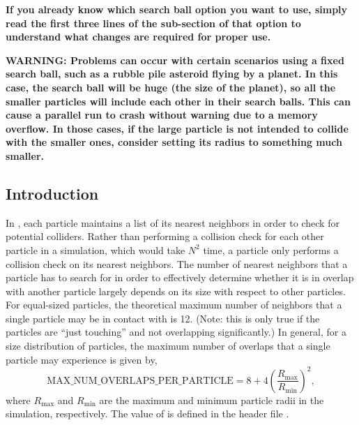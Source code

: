 \textbf{If you already know which search ball option you want to use,
  simply read the first three lines of the sub-section of that option
  to understand what changes are required for proper use.}

\textbf{WARNING: Problems can occur with certain scenarios using a
  fixed search ball, such as a rubble pile asteroid flying by a
  planet.  In this case, the search ball will be huge (the size of the
  planet), so all the smaller particles will include each other in
  their search balls.  This can cause a parallel run to crash without
  warning due to a memory overflow.  In those cases, if the large
  particle is not intended to collide with the smaller ones, consider
  setting its radius to something much smaller.}

\subsection{Introduction}

In , each particle maintains a list of its nearest
neighbors in order to check for potential colliders. Rather than
performing a collision check for each other particle in a simulation,
which would take $N^2$ time, a particle only performs a collision
check on its nearest neighbors. The number of nearest neighbors that a
particle has to search for in order to effectively determine whether
it is in overlap with another particle largely depends on its size
with respect to other particles. For equal-sized particles, the
theoretical maximum number of neighbors that a single particle may be
in contact with is 12. (Note: this is only true if the particles are
``just touching'' and not overlapping significantly.) In general, for
a size distribution of particles, the maximum number of overlaps that
a single particle may experience is given by,
\begin{equation}
  \mathrm{MAX\_NUM\_OVERLAPS\_PER\_PARTICLE} = 8 + 4 \left(
  \frac{R_{\mathrm{max}}}{R_{\mathrm{min}}} \right)^2
  , \label{e:maxovlp}
\end{equation}
where $R_{\mathrm{max}}$ and $R_{\mathrm{min}}$ are the maximum and
minimum particle radii in the simulation, respectively. The value of
 is defined in the header file
.

